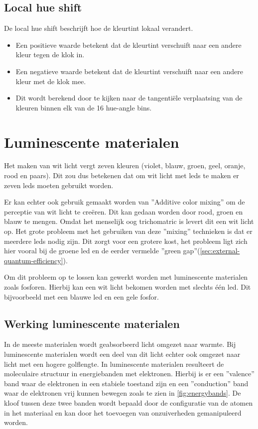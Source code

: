 \subsection{Local hue shift}

De local hue shift beschrijft hoe de kleurtint lokaal verandert.

\begin{itemize}
    \item Een positieve waarde betekent dat de kleurtint verschuift naar een andere kleur tegen de klok in.
    \item Een negatieve waarde betekent dat de kleurtint verschuift naar een andere kleur met de klok mee.
    \item Dit wordt berekend door te kijken naar de tangenti\"ele verplaatsing van de kleuren binnen elk van de 16 hue-angle bins.
\end{itemize}

\section{Luminescente materialen}

Het maken van wit licht vergt zeven kleuren (violet, blauw, groen, geel, oranje, rood en paars). Dit zou dus betekenen dat om wit licht met \gls{led}s te maken er zeven \gls{led}s moeten gebruikt worden.

Er kan echter ook gebruik gemaakt worden van ''Additive color mixing'' om de perceptie van wit licht te cre\"eren. Dit kan gedaan worden door rood, groen en blauw te mengen. Omdat het menselijk oog trichomatric is levert dit een wit licht op. Het grote probleem met het gebruiken van deze ''mixing'' technieken is dat er meerdere \gls{led}s nodig zijn. Dit zorgt voor een grotere kost, het probleem ligt zich hier vooral bij de groene \gls{led} en de eerder vermelde ''green gap''(\cref{sec:external-quantum-efficiency}).

Om dit probleem op te lossen kan gewerkt worden met luminescente materialen zoals fosforen. Hierbij kan een wit licht bekomen worden met slechts \'e\'en \gls{led}. Dit bijvoorbeeld met een blauwe \gls{led} en een gele fosfor.

\subsection{Werking luminescente materialen}

In de meeste materialen wordt geabsorbeerd licht omgezet naar warmte. Bij luminescente materialen wordt een deel van dit licht echter ook omgezet naar licht met een hogere golflengte. In luminescente materialen resulteert de moleculaire structuur in energiebanden met elektronen. Hierbij is er een ''valence'' band waar de elektronen in een stabiele toestand zijn en een ''conduction'' band waar de elektronen vrij kunnen bewegen zoals te zien in \cref{fig:energybands}. De kloof tussen deze twee banden wordt bepaald door de configuratie van de atomen in het materiaal en kan door het toevoegen van onzuiverheden gemanipuleerd worden.

